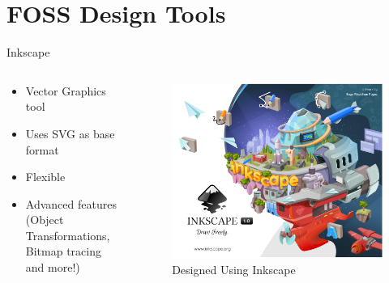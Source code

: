 \documentclass[presentation]{beamer}
\begin{document}
\section*{FOSS Design Tools}
\label{sec:org7ad5e41}
\begin{frame}[label={sec:org51e1cb3}]{Inkscape}
\begin{columns}
\begin{column}{0.5\columnwidth}
\begin{itemize}
\item Vector Graphics tool
\item Uses SVG as base format
\item Flexible
\item Advanced features (Object Transformations, Bitmap tracing and more!)
\end{itemize}
\end{column}
\begin{column}{0.5\columnwidth}
\begin{figure}[htbp]
\centering
\includegraphics[width=.9\linewidth]{././inkscape.png}
\caption{Designed Using Inkscape}
\end{figure}
\end{column}
\end{columns}
\end{frame}
\end{document}
